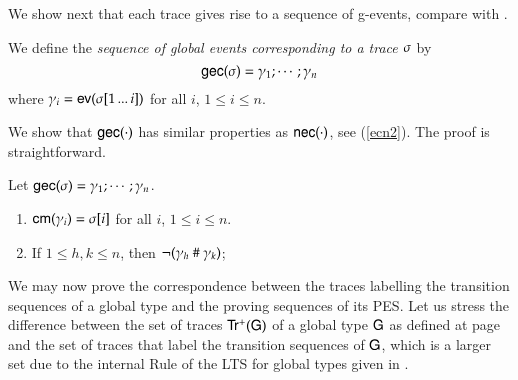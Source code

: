  We show next that each trace gives rise to a sequence of
g-events,  compare with .  %



\begin{definition}
\label{gecdef}
We define the {\em sequence of global events corresponding to a
   trace  $\sigma$} by
\[
  {\sf gec}(\sigma)=\gamma_1;\cdots;\gamma_n
  \]
  where
   $\gamma_i={\sf ev}(\sigma[1\,...\,i])$ for all $i$,  $1\leq i\leq n$. 
  \end{definition}
  
  We show that ${\sf gec}(\cdot)$ has similar properties as  ${\sf nec}(\cdot)$, see (\ref{ecn2}).  The proof is straightforward.  
  
  \begin{lemma}
Let  ${\sf gec}(\sigma)=\gamma_1;\cdots;\gamma_n$. 

\begin{enumerate}
\item {} ${\sf cm}(\gamma_i)=\sigma[i]$  for all $i$,  $1\leq i\leq n$. 
\item {} If $1\leq h,k\leq n$, then $\neg (\gamma_h~\#~\gamma_k)$;
 \end{enumerate}
 
  \end{lemma}
  
 We may now prove the correspondence between the traces labelling
the transition sequences of a global type and the proving sequences of
its PES. Let us stress the difference between the set of traces
${\sf Tr^+}({\sf G})$ of a global type ${\sf G}$ as defined at page
\pageref{G-traces} and the set of traces that label the transition
sequences of ${\sf G}$, which is a larger set due to the internal Rule
 of the LTS for global types given in .   



